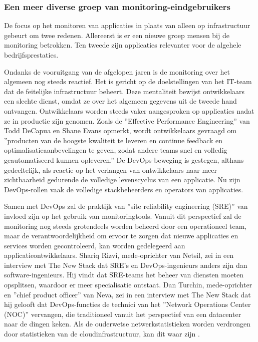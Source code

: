 \subsubsection{Een meer diverse groep van monitoring-eindgebruikers}

De focus op het monitoren van applicaties in plaats van alleen op infrastructuur gebeurt om twee redenen. Allereerst is er een nieuwe groep mensen bij de monitoring betrokken. Ten tweede zijn applicaties relevanter voor de algehele bedrijfsprestaties. 

Ondanks de vooruitgang van de afgelopen jaren is de monitoring over het algemeen nog steeds reactief. Het is gericht op de doelstellingen van het IT-team dat de feitelijke infrastructuur beheert. Deze mentaliteit bewijst ontwikkelaars een slechte dienst, omdat ze over het algemeen gegevens uit de tweede hand ontvangen. Ontwikkelaars worden steeds vaker aangesproken op applicaties nadat ze in productie zijn genomen. Zoals de ''Effective Performance Engineering'' van Todd DeCapua en Shane Evans opmerkt, wordt ontwikkelaars gevraagd om ''producten van de hoogste kwaliteit te leveren en continue feedback en optimalisatieaanbevelingen te geven, zodat andere teams snel en volledig geautomatiseerd kunnen opleveren.'' De DevOps-beweging is gestegen, althans gedeeltelijk, als reactie op het verlangen van ontwikkelaars naar meer zichtbaarheid gedurende de volledige levenscyclus van een applicatie. Nu zijn DevOps-rollen vaak de volledige stackbeheerders en operators van applicaties. 

Samen met DevOps zal de praktijk van ''site reliability engineering (SRE)'' van invloed zijn op het gebruik van monitoringtools. Vanuit dit perspectief zal de monitoring nog steeds grotendeels worden beheerd door een operationeel team, maar de verantwoordelijkheid om ervoor te zorgen dat nieuwe applicaties en services worden gecontroleerd, kan worden gedelegeerd aan applicatieontwikkelaars. Shariq Rizvi, mede-oprichter van Netsil, zei in een interview met The New Stack dat SRE's en DevOps-ingenieurs anders zijn dan software-ingenieurs. Hij vindt dat SRE-teams het beheer van diensten moeten opsplitsen, waardoor er meer specialisatie ontstaat. Dan Turchin, mede-oprichter en ''chief product officer'' van Neva, zei in een interview met The New Stack dat hij gelooft dat DevOps-functies de technici van het ''Network Operations Center (NOC)'' vervangen, die traditioneel vanuit het perspectief van een datacenter naar de dingen keken. Als de ouderwetse netwerkstatistieken worden verdrongen door statistieken van de cloudinfrastructuur, kan dit waar zijn \autocite{Williams2016}. 

